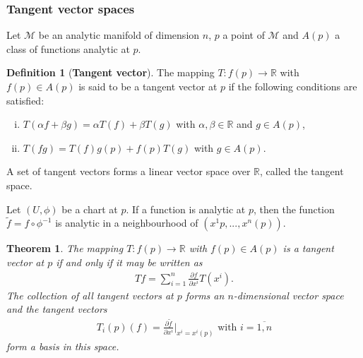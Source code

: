 \documentclass[12pt,a4paper]{report}
\newtheorem{theorem}{Theorem}
\theoremstyle{definition}
\newtheorem{definition}{Definition}
\theoremstyle{remark}
\theoremstyle{remark}
\begin{document}
\subsubsection{Tangent vector spaces}
Let $\mathcal{M}$ be an analytic manifold of dimension $n$, $p$ a point of $\mathcal{M}$ and $A(p)$ a class of functions analytic at $p$.
\begin{definition}[\textbf{Tangent vector}]
\label{deftangent}
The mapping $T:f(p)\rightarrow\mathbb{R}$ with $f(p)\in A(p)$ is said to be a tangent vector at $p$ if the following conditions are satisfied:
\begin{enumerate}[i.]
\item $T(\alpha f+\beta g)=\alpha T(f)+\beta T(g)$ with $\alpha,\beta\in\mathbb{R}$ and $g\in A(p)$,
\item $T(fg)=T(f)g(p)+f(p)T(g)$ with $g\in A(p)$.
\end{enumerate}
A set of tangent vectors forms a linear vector space over $\mathbb{R}$, called the tangent space. 
\end{definition}
Let $(U,\phi)$ be a chart at $p$. If a function is analytic at $p$, then the function $\widetilde{f}=f\circ\phi^{-1}$ is analytic in a neighbourhood of $(x^1{p},...,x^n(p))$.
\begin{theorem}
\label{thtangent}
The mapping $T:f(p)\rightarrow\mathbb{R}$ with $f(p)\in A(p)$ is a tangent vector at $p$ if and only if it may be written as
\begin{align*}
Tf=\sum_{i=1}^n\frac{\partial f}{\partial x^i}T(x^i).
\end{align*}
The collection of all tangent vectors at $p$ forms an $n$-dimensional vector space and the tangent vectors
\begin{align*}
T_i(p)(f)=\frac{\partial \widetilde{f}}{\partial x^i}\bigg\rvert_{x^i=x^i(p)} \text{ with }i=\overline{1,n}
\end{align*}
form a basis in this space.
\end{theorem}
\end{document}
